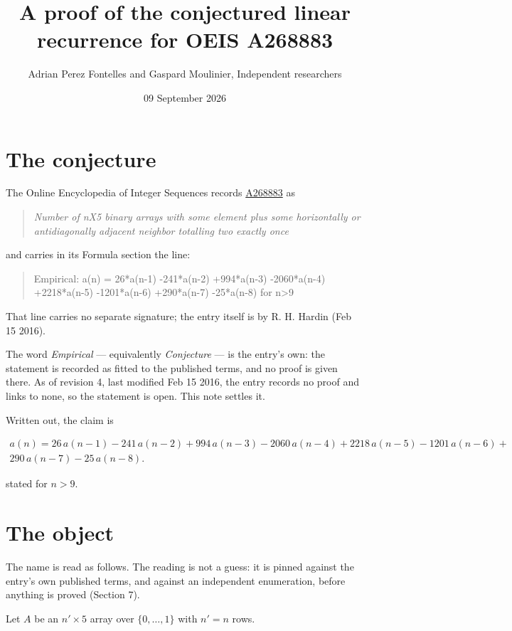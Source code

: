 \documentclass[11pt]{article}
\title{A proof of the conjectured linear recurrence for OEIS A268883}
\author{Adrian Perez Fontelles and Gaspard Moulinier, Independent researchers}
\date{09 September 2026}
\theoremstyle{definition}
\begin{document}
\maketitle
\section{The conjecture}

The Online Encyclopedia of Integer Sequences records \href{https://oeis.org/A268883}{A268883} as

\begin{quote}\itshape Number of nX5 binary arrays with some element plus some horizontally or antidiagonally adjacent neighbor totalling two exactly once\end{quote}

and carries in its Formula section the line:

\begin{quote}\ttfamily Empirical: a(n) = 26*a(n-1) -241*a(n-2) +994*a(n-3) -2060*a(n-4) +2218*a(n-5) -1201*a(n-6) +290*a(n-7) -25*a(n-8) for n>9\end{quote}

That line carries no separate signature; the entry itself is by R. H. Hardin (Feb 15 2016).

The word {\itshape Empirical} --- equivalently {\itshape Conjecture} --- is the entry's own: the statement is recorded as fitted to the published terms, and no proof is given there. As of revision 4, last modified Feb 15 2016, the entry records no proof and links to none, so the statement is open. This note settles it.

Written out, the claim is

\begin{multline*} a(n) = 26\,a(n-1) - 241\,a(n-2) + 994\,a(n-3) - 2060\,a(n-4) + 2218\,a(n-5) - 1201\,a(n-6) + \\ 290\,a(n-7) - 25\,a(n-8). \end{multline*}

stated for $n > 9$.

\section{The object}

The name is read as follows. The reading is not a guess: it is pinned against the entry's own published terms, and against an independent enumeration, before anything is proved (Section 7).

Let $A$ be an $n' \times 5$ array over $\{0,\dots,1\}$ with $n' = n$ rows.
\end{document}
